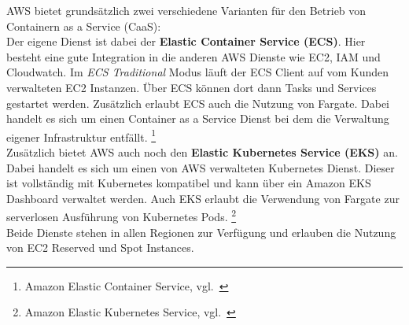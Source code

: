 
AWS bietet grundsätzlich zwei verschiedene Varianten für den Betrieb von Containern as a Service (CaaS): \\

Der eigene Dienst ist dabei der \textbf{Elastic Container Service (ECS)}.
Hier besteht eine gute Integration in die anderen AWS Dienste wie EC2, IAM und Cloudwatch.
Im \textit{ECS Traditional} Modus läuft der ECS Client auf vom Kunden verwalteten EC2 Instanzen.
Über ECS können dort dann Tasks und Services gestartet werden.
Zusätzlich erlaubt ECS auch die Nutzung von Fargate.
Dabei handelt es sich um einen Container as a Service Dienst bei dem die Verwaltung eigener Infrastruktur entfällt.
\footnote{{Amazon Elastic Container Service, vgl.~\cite{AWS_ECS}}} \\

Zusätzlich bietet AWS auch noch den \textbf{Elastic Kubernetes Service (EKS)} an.
Dabei handelt es sich um einen von AWS verwalteten Kubernetes Dienst.
Dieser ist vollständig mit Kubernetes kompatibel und kann über ein Amazon EKS Dashboard verwaltet werden.
Auch EKS erlaubt die Verwendung von Fargate zur serverlosen Ausführung von Kubernetes Pods.
\footnote{{Amazon Elastic Kubernetes Service, vgl.~\cite{AWS_EKS}}} \\

Beide Dienste stehen in allen Regionen zur Verfügung und erlauben die Nutzung von EC2 Reserved und Spot Instances.